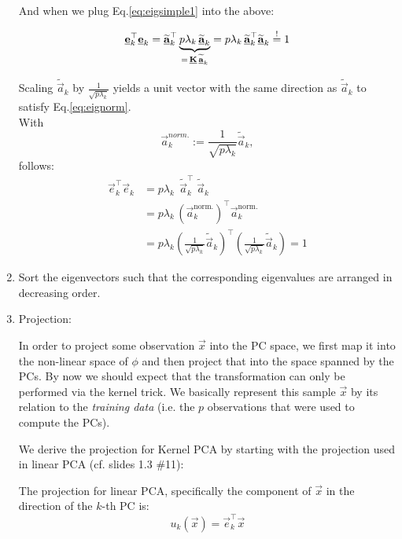\begin{enumerate}
And when we plug Eq.\ref{eq:eigsimple1} into the above:

\begin{equation}
\label{eq:eignorm}
\underline{\mathbf{e}}^{\top}_k \underline{\mathbf{e}}_k = 
\widetilde {\underline{\mathbf{a}}}_k^\top 
\underbrace{p \lambda_k \, \widetilde {\underline{\mathbf{a}}}_k}_{=\, \underline{\mathbf{K}} \, \widetilde {\underline{\mathbf{a}}}_k} 
= p \lambda_k \, \widetilde {\underline{\mathbf{a}}}_k^\top \widetilde {\underline{\mathbf{a}}}_k  \stackrel{\mathrm{!}}{=} 1
\end{equation}

Scaling $\widetilde {\vec a}_k$ by $\frac{1}{\sqrt{p \lambda_k}}$ yields 
a unit vector with the same direction as $\widetilde {\vec a}_k$ to satisfy Eq.\ref{eq:eignorm}.\\
With
\begin{equation}
\vec a_k^{norm.} := \frac{1}{\sqrt{p \lambda_k}} \widetilde {\vec a}_k,
\end{equation}
follows:
\begin{align}
\vec e^{\top}_k \vec e_k 
&= p \lambda_k \, \; \widetilde {\vec a}_k^\top \; \widetilde {\vec a}_k\\
&= p \lambda_k \, \left(\vec a_k^{\text{norm.}}\right)^\top \vec a_k^{\text{norm.}} \\
&= p \lambda_k \left(\frac{1}{\sqrt{p \lambda_k}} \widetilde {\vec a}_k\right)^\top \left(\frac{1}{\sqrt{p \lambda_k}} \widetilde {\vec a}_k\right)
= 1
\end{align}


\newpage

\item Sort the eigenvectors such that the corresponding eigenvalues are arranged in decreasing order. 


\item Projection:

In order to project some observation $\vec x$ into the PC space, we first map it into the non-linear space of $\phi$ 
and then project that into the space spanned by the PCs. 
By now we should expect that the transformation can only be performed via the kernel trick. 
We basically represent this sample $\vec x$ by its relation to the \emph{training data} 
(i.e. the $p$ observations that were used to compute the PCs).

We derive the projection for Kernel PCA by starting with the projection used in linear PCA (cf. slides 1.3 \#11):

The projection for linear PCA, specifically the component of $\vec x$ in the direction of the $k$-th PC is:
\begin{equation}
\label{eq:projlin}
u_k(\vec x) = \vec e_k^\top \vec x
\end{equation}


\end{enumerate}
